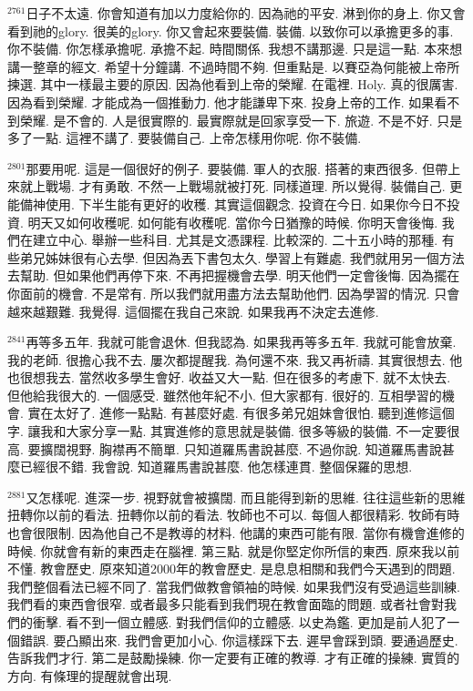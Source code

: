 \documentclass{book}
\begin{document}
$^{2761}$日子不太遠.
你會知道有加以力度給你的.
因為祂的平安.
淋到你的身上.
你又會看到祂的glory.
很美的glory.
你又會起來要裝備.
裝備.
以致你可以承擔更多的事.
你不裝備.
你怎樣承擔呢.
承擔不起.
時間關係.
我想不講那邊.
只是這一點.
本來想講一整章的經文.
希望十分鐘講.
不過時間不夠.
但重點是.
以賽亞為何能被上帝所揀選.
其中一樣最主要的原因.
因為他看到上帝的榮耀.
在電裡.
Holy.
真的很厲害.
因為看到榮耀.
才能成為一個推動力.
他才能謙卑下來.
投身上帝的工作.
如果看不到榮耀.
是不會的.
人是很實際的.
最實際就是回家享受一下.
旅遊.
不是不好.
只是多了一點.
這裡不講了.
要裝備自己.
上帝怎樣用你呢.
你不裝備.

$^{2801}$那要用呢.
這是一個很好的例子.
要裝備.
軍人的衣服.
搭著的東西很多.
但帶上來就上戰場.
才有勇敢.
不然一上戰場就被打死.
同樣道理.
所以覺得.
裝備自己.
更能備神使用.
下半生能有更好的收穫.
其實這個觀念.
投資在今日.
如果你今日不投資.
明天又如何收穫呢.
如何能有收穫呢.
當你今日猶豫的時候.
你明天會後悔.
我們在建立中心.
舉辦一些科目.
尤其是文憑課程.
比較深的.
二十五小時的那種.
有些弟兄姊妹很有心去學.
但因為丟下書包太久.
學習上有難處.
我們就用另一個方法去幫助.
但如果他們再停下來.
不再把握機會去學.
明天他們一定會後悔.
因為擺在你面前的機會.
不是常有.
所以我們就用盡方法去幫助他們.
因為學習的情況.
只會越來越艱難.
我覺得.
這個擺在我自己來說.
如果我再不決定去進修.

$^{2841}$再等多五年.
我就可能會退休.
但我認為.
如果我再等多五年.
我就可能會放棄.
我的老師.
很擔心我不去.
屢次都提醒我.
為何還不來.
我又再祈禱.
其實很想去.
他也很想我去.
當然收多學生會好.
收益又大一點.
但在很多的考慮下.
就不太快去.
但他給我很大的.
一個感受.
雖然他年紀不小.
但大家都有.
很好的.
互相學習的機會.
實在太好了.
進修一點點.
有甚麼好處.
有很多弟兄姐妹會很怕.
聽到進修這個字.
讓我和大家分享一點.
其實進修的意思就是裝備.
很多等級的裝備.
不一定要很高.
要擴闊視野.
胸襟再不簡單.
只知道羅馬書說甚麼.
不過你說.
知道羅馬書說甚麼已經很不錯.
我會說.
知道羅馬書說甚麼.
他怎樣連貫.
整個保羅的思想.

$^{2881}$又怎樣呢.
進深一步.
視野就會被擴闊.
而且能得到新的思維.
往往這些新的思維扭轉你以前的看法.
扭轉你以前的看法.
牧師也不可以.
每個人都很精彩.
牧師有時也會很限制.
因為他自己不是教導的材料.
他講的東西可能有限.
當你有機會進修的時候.
你就會有新的東西走在腦裡.
第三點.
就是你堅定你所信的東西.
原來我以前不懂.
教會歷史.
原來知道2000年的教會歷史.
是息息相關和我們今天遇到的問題.
我們整個看法已經不同了.
當我們做教會領袖的時候.
如果我們沒有受過這些訓練.
我們看的東西會很窄.
或者最多只能看到我們現在教會面臨的問題.
或者社會對我們的衝擊.
看不到一個立體感.
對我們信仰的立體感.
以史為鑑.
更加是前人犯了一個錯誤.
要凸顯出來.
我們會更加小心.
你這樣踩下去.
遲早會踩到頭.
要通過歷史.
告訴我們才行.
第二是鼓勵操練.
你一定要有正確的教導.
才有正確的操練.
實質的方向.
有條理的提醒就會出現.
\end{document}
